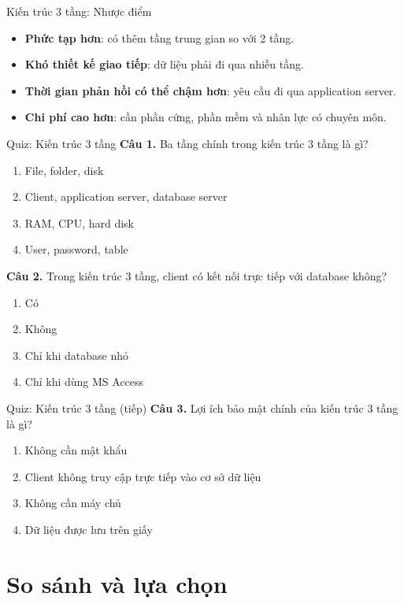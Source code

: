 \documentclass[aspectratio=169,11pt]{beamer}
\newcommand{\keyword}[1]{\textcolor{accent}{\textbf{#1}}}
\newcommand{\tightlist}{\setlength{\itemsep}{2pt}\setlength{\parskip}{0pt}}
\newcommand{\qoption}[2]{\item[#1.] #2}
\begin{document}
\begin{frame}{Kiến trúc 3 tầng: Nhược điểm}
\small
\begin{itemize}
\tightlist
  \item \keyword{Phức tạp hơn}: có thêm tầng trung gian so với 2 tầng.
  \item \keyword{Khó thiết kế giao tiếp}: dữ liệu phải đi qua nhiều tầng.
  \item \keyword{Thời gian phản hồi có thể chậm hơn}: yêu cầu đi qua application server.
  \item \keyword{Chi phí cao hơn}: cần phần cứng, phần mềm và nhân lực có chuyên môn.
\end{itemize}
\end{frame}

\begin{frame}{Quiz: Kiến trúc 3 tầng}
\small
\textbf{Câu 1.} Ba tầng chính trong kiến trúc 3 tầng là gì?
\begin{enumerate}
\tightlist
  \qoption{A}{File, folder, disk}
  \qoption{B}{Client, application server, database server}
  \qoption{C}{RAM, CPU, hard disk}
  \qoption{D}{User, password, table}
\end{enumerate}

\textbf{Câu 2.} Trong kiến trúc 3 tầng, client có kết nối trực tiếp với database không?
\begin{enumerate}
\tightlist
  \qoption{A}{Có}
  \qoption{B}{Không}
  \qoption{C}{Chỉ khi database nhỏ}
  \qoption{D}{Chỉ khi dùng MS Access}
\end{enumerate}
\end{frame}

\begin{frame}{Quiz: Kiến trúc 3 tầng (tiếp)}
\small
\textbf{Câu 3.} Lợi ích bảo mật chính của kiến trúc 3 tầng là gì?
\begin{enumerate}
\tightlist
  \qoption{A}{Không cần mật khẩu}
  \qoption{B}{Client không truy cập trực tiếp vào cơ sở dữ liệu}
  \qoption{C}{Không cần máy chủ}
  \qoption{D}{Dữ liệu được lưu trên giấy}
\end{enumerate}
\end{frame}

\section{So sánh và lựa chọn}
\end{document}
